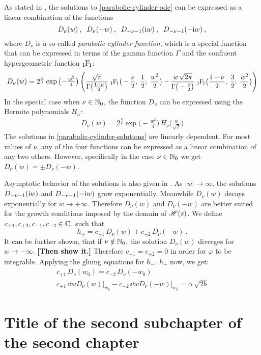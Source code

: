 As stated in \cite{GradshteynRyzhik}, the solutions to \eqref{parabolic-cylinder-ode} can be expressed as a linear combination of the functions
\begin{equation}
    D_\nu(w) \: , \;\;
    D_\nu(-w) \: , \;\;
    D_{-\nu-1}(\mathrm{i} w) \: , \;\;
    D_{-\nu-1}(-\mathrm{i} w) \: ,
    \label{parabolic-cylinder-solutions}
\end{equation}
where $D_\nu$ is a so-called \textit{parabolic cylinder function}, which is a special function that can be expressed in terms of the gamma function $\Gamma$ and the confluent hypergeometric function $\hypF$:
\begin{align*}
    D_\nu(w)
    = 2^{\frac{\nu}{2}}
    \exp \big({-}\tfrac{w^2}{4} \big) \,
    \scalemath{0.93}{
    \Bigg(
        \frac{\sqrt{\pi}}{\Gamma\big( \frac{1-\nu}{2} \big)} \;
        \hypF\big( -\frac{\nu}{2}, \; \frac{1}{2} ; \; \frac{w^2}{2} \big)
        - \frac{w \, \sqrt{2\pi}}{\Gamma\big( -\frac{\nu}{2} \big)} \;
        \hypF\big( \frac{1-\nu}{2}, \; \frac{3}{2} ; \; \frac{w^2}{2} \big)
    \Bigg)
    }
\end{align*}
In the special case when $\nu \in \mathbb{N}_0$, the function $D_\nu$ can be expressed using the Hermite polynomials $H_n$:
\begin{align*}
    D_\nu(w)
    = 2^{\frac{\nu}{2}}
    \exp \big({-}\tfrac{w^2}{4} \big) \,
    H_\nu \big( \frac{w}{\sqrt{2}} \big)
\end{align*}
The solutions in \eqref{parabolic-cylinder-solutions} are linearly dependent. For most values of $\nu$, any of the four functions can be expressed as a linear combination of any two others. However, specifically in the case $\nu \in \mathbb{N}_0$ we get $D_\nu(w) = \pm D_\nu(-w)$.

Asymptotic behavior of the solutions is also given in \cite{GradshteynRyzhik}. As $|w|\to\infty$, the solutions $D_{-\nu-1}(\mathrm{i} w)$ and $D_{-\nu-1}(-\mathrm{i} w)$ grow exponentially. Meanwhile $D_\nu(w)$ decays exponentially for $w \to +\infty$. Therefore $D_\nu(w)$ and $D_\nu(-w)$ are better suited for the growth conditions imposed by the domain of $\mathscr{H}(s)$. We define $c_{+1}, c_{+2}, c_{-1}, c_{-2} \in \mathbb{C}$, such that
\begin{equation*}
    h_\pm = c_{\pm 1} \, D_\nu(w) + c_{\pm 2} \, D_\nu(-w) \: .
\end{equation*}
It can be further shown, that if $\nu \notin \mathbb{N}_0$, the solution $D_\nu(w)$ diverges for $w \to -\infty$. \textbf{[Then show it.]} Therefore $c_{-1} = c_{+2} = 0$ in order for $\varphi$ to be integrable. Applying the gluing equations for $h_-, \, h_+$ now, we get:
\begin{gather*}
    c_{+1} \, D_\nu(w_0) = c_{-2} \, D_\nu(-w_0) \\[5pt]
    c_{+1} \, \dd{}{w} D_\nu(w) \big|_{w_0} - c_{-2} \, \dd{}{w} D_\nu(-w) \big|_{w_0} = \alpha \, \sqrt{2b}
\end{gather*}

\section{Title of the second subchapter of the second chapter}
